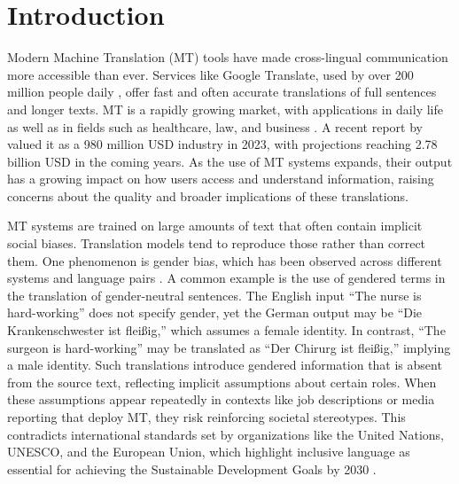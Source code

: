 \chapter{Introduction}
    Modern Machine Translation (MT) tools have made cross-lingual communication more accessible than ever. Services like Google Translate, used by over 200 million people daily \parencite{pratesAssessingGenderBias2019,shresthaExploringGenderBiases2022}, offer fast and often accurate translations of full sentences and longer texts. MT is a rapidly growing market, with applications in daily life as well as in fields such as healthcare, law, and business \parencite{kapplAreAllSpanish2025}. A recent report by \textcite{skyquestMachineTranslationMT2025} valued it as a 980 million USD industry in 2023, with projections reaching 2.78 billion USD in the coming years. As the use of MT systems expands, their output has a growing impact on how users access and understand information, raising concerns about the quality and broader implications of these translations.
    
    MT systems are trained on large amounts of text that often contain implicit social biases. Translation models tend to reproduce those rather than correct them. One phenomenon is gender bias, which has been observed across different systems and language pairs \parencite{choMeasuringGenderBias2019,soundararajanInvestigatingGenderBias2024,smacchiaDoesAIReflect2024}. A common example is the use of gendered terms in the translation of gender-neutral sentences. The English input “The nurse is hard-working” does not specify gender, yet the German output may be “Die Krankenschwester ist fleißig,” which assumes a female identity. In contrast, “The surgeon is hard-working” may be translated as “Der Chirurg ist fleißig,” implying a male identity. Such translations introduce gendered information that is absent from the source text, reflecting implicit assumptions about certain roles. When these assumptions appear repeatedly in contexts like job descriptions or media reporting that deploy MT, they risk reinforcing societal stereotypes. This contradicts international standards set by organizations like the United Nations, UNESCO, and the European Union, which highlight inclusive language as essential for achieving the Sustainable Development Goals by 2030 \parencite{sczesnyCanGenderFairLanguage2016,unitednationsAchieveGenderEquality2023}.

